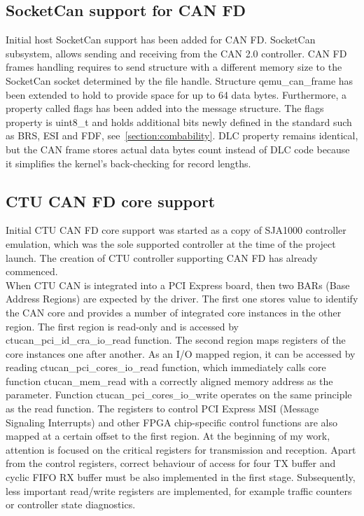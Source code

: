 \documentclass{ctuthesis}
\begin{document}
 \subsection{SocketCan support for CAN FD}
  Initial host SocketCan support has been added for CAN FD. SocketCan subsystem, allows sending and receiving from the CAN 2.0 controller. CAN FD frames handling requires to send structure with a different memory size to the SocketCan socket determined by the file handle. Structure qemu\_can\_frame has been extended to hold to provide space for up to 64 data bytes. Furthermore, a property called flags has been added into the message structure. The flags property is uint8\_t and holds additional bits newly defined in the standard such as BRS, ESI and FDF, see~\ref{section:combability}. DLC property remains identical, but the CAN frame stores actual data bytes count instead of DLC code because it simplifies the kernel's back-checking for record lengths.

 \subsection{CTU CAN FD core support}
  Initial CTU CAN FD core support was started as a copy of SJA1000 controller emulation, which was the sole supported controller at the time of the project launch. The creation of CTU controller supporting CAN FD  has already commenced. \\
  When CTU CAN is integrated into a PCI Express board, then two BARs (Base Address Regions) are expected by the driver. The first one stores value to identify the CAN core and provides a number of integrated core instances in the other region. The first region is read-only and is accessed by ctucan\_pci\_id\_cra\_io\_read function. The second region maps registers of the core instances one after another. As an I/O mapped region, it can be accessed by reading ctucan\_pci\_cores\_io\_read function, which immediately calls core function ctucan\_mem\_read with a correctly aligned memory address as the parameter. Function ctucan\_pci\_cores\_io\_write operates on the same principle as the read function. The registers to control PCI Express MSI (Message Signaling Interrupts) and other FPGA chip-specific control functions are also mapped at a certain offset to the first region. At the beginning of my work, attention is focused on the critical registers for transmission and reception. Apart from the control registers, correct behaviour of access for four TX buffer and cyclic FIFO RX buffer must be also implemented in the first stage. Subsequently, less important read/write registers are implemented, for example traffic counters or controller state diagnostics.
 
\end{document}
